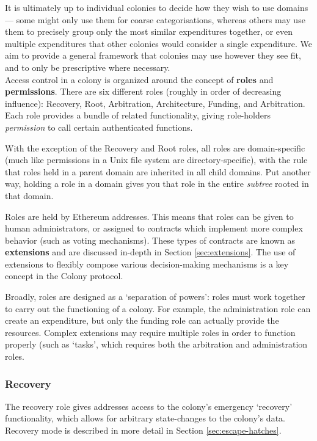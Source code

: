 It is ultimately up to individual colonies to decide how they wish to use domains --- some might only use them for coarse categorisations, whereas others may use them to precisely group only the most similar expenditures together, or even multiple expenditures that other colonies would consider a single expenditure. We aim to provide a general framework that colonies may use however they see fit, and to only be prescriptive where necessary. \\

Access control in a colony is organized around the concept of \textbf{roles} and \textbf{permissions}. There are six different roles (roughly in order of decreasing influence): Recovery, Root, Arbitration, Architecture, Funding, and Arbitration. Each role provides a bundle of related functionality, giving role-holders \textit{permission} to call certain authenticated functions.

With the exception of the Recovery and Root roles, all roles are domain-specific (much like permissions in a Unix file system are directory-specific), with the rule that roles held in a parent domain are inherited in all child domains. Put another way, holding a role in a domain gives you that role in the entire \textit{subtree} rooted in that domain.

Roles are held by Ethereum addresses. This means that roles can be given to human administrators, or assigned to contracts which implement more complex behavior (such as voting mechanisms). These types of contracts are known as \textbf{extensions} and are discussed in-depth in Section \ref{sec:extensions}. The use of extensions to flexibly compose various decision-making mechanisms is a key concept in the Colony protocol.

Broadly, roles are designed as a `separation of powers': roles must work together to carry out the functioning of a colony. For example, the administration role can create an expenditure, but only the funding role can actually provide the resources. Complex extensions may require multiple roles in order to function properly (such as `tasks', which requires both the arbitration and administration roles.

\subsubsection*{Recovery}

The recovery role gives addresses access to the colony's emergency `recovery' functionality, which allows for arbitrary state-changes to the colony's data. Recovery mode is described in more detail in Section \ref{sec:escape-hatches}.

